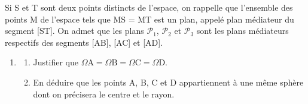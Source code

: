 \documentclass[10pt]{article}
\begin{document}
\medskip

Si S et T sont deux points distincts de l'espace, on rappelle que l'ensemble des points M de l'espace tels que MS = MT est un plan, appelé plan médiateur du segment [ST]. On admet que les plans $\mathcal{P}_1$,\: $\mathcal{P}_2$ et $\mathcal{P}_3$ sont les plans médiateurs respectifs des
segments [AB], [AC] et [AD].

\begin{enumerate}[resume]
\item
	\begin{enumerate}
		\item Justifier que $\Omega \text{A} = \Omega \text{B} = \Omega \text{C} = \Omega \text{D}$.
		\item En déduire que les points A, B, C et D appartiennent à une même sphère dont
on précisera le centre et le rayon.
	\end{enumerate}
\end{enumerate}
\end{document}
